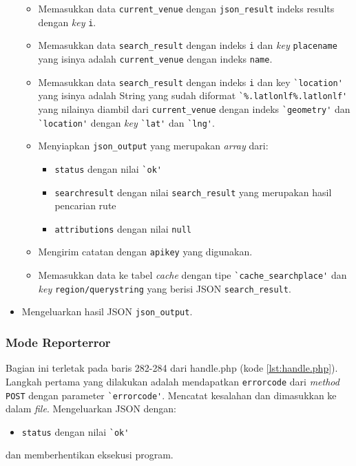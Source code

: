 \begin{itemize}
	\begin{itemize}
		\item Memasukkan data \verb!current_venue! dengan \verb!json_result! indeks results dengan \textit{key} \verb!i!.
		\item Memasukkan data \verb!search_result! dengan indeks \verb!i! dan \textit{key} \verb!placename! yang isinya adalah \verb!current_venue! dengan indeks \verb!name!.
		\item Memasukkan data \verb!search_result! dengan indeks \verb!i! dan key \verb!`location'! yang isinya adalah String yang sudah diformat \verb!`%.latlonlf%.latlonlf'! yang nilainya diambil dari \verb!current_venue! dengan indeks \verb!`geometry'! dan \verb!`location'! dengan \textit{key} \verb!`lat'! dan \verb!`lng'!.
		\item Menyiapkan \verb!json_output! yang merupakan \textit{array} dari:
		\begin{itemize}
			\item \verb!status! dengan nilai \verb!`ok'!
			\item \verb!searchresult! dengan nilai \verb!search_result! yang merupakan hasil pencarian rute
			\item \verb!attributions! dengan nilai \verb!null!
		\end{itemize}
		\item Mengirim catatan dengan \verb!apikey! yang digunakan.
		\item Memasukkan data ke tabel \textit{cache} dengan tipe \verb!`cache_searchplace'! dan \textit{key} \verb!region/querystring! yang berisi JSON \verb!search_result!.
	\end{itemize}
	\item Mengeluarkan hasil JSON \verb!json_output!.
\end{itemize}

\subsubsection{Mode Reporterror}
Bagian ini terletak pada baris 282-284 dari handle.php (kode \ref{lst:handle.php}). Langkah pertama yang dilakukan adalah mendapatkan \verb!errorcode! dari \textit{method} \verb!POST! dengan parameter \verb!`errorcode'!. Mencatat kesalahan dan dimasukkan ke dalam \textit{file}. Mengeluarkan JSON dengan:
\begin{itemize}
			\item \verb!status! dengan nilai \verb!`ok'!
\end{itemize} 
dan memberhentikan eksekusi program.

